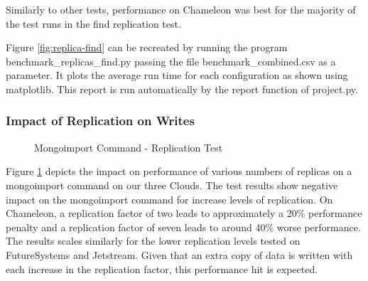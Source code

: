 \documentclass[9pt,twocolumn,twoside]{../../styles/osajnl}
\begin{document}
Similarly to other tests, performance on Chameleon was best for the majority of the test runs in the find replication test.

Figure \ref{fig:replica-find} can be recreated by running the program benchmark\_replicas\_find.py passing the file benchmark\_combined.csv as a parameter.  It plots the average run time for each configuration as shown using matplotlib. This report is run automatically by the report function of project.py.



\subsubsection{Impact of Replication on Writes}


\begin{figure}[htbp]
\centering
{}
\caption{Mongoimport Command - Replication Test}
\label{fig:replica-import}
\end{figure}


Figure \ref{fig:replica-import} depicts the impact on performance of various numbers of replicas on a mongoimport command on our three Clouds.  The test results show negative impact on the mongoimport command for increase levels of replication.  On Chameleon, a replication factor of two leads to approximately a 20\% performance penalty and a replication factor of seven leads to around 40\% worse performance.  The results scales similarly for the lower replication levels tested on FutureSystems and Jetstream.  Given that an extra copy of data is written with each increase in the replication factor, this performance hit is expected.
\end{document}
